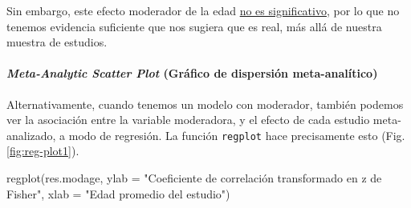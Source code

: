 \documentclass[
  bookmarksnumbered]{article}
\newenvironment{Shaded}{\begin{snugshade}}{\end{snugshade}}
\newcommand{\AttributeTok}[1]{\textcolor[rgb]{0.00,0.34,0.68}{#1}}
\newcommand{\FunctionTok}[1]{\textcolor[rgb]{0.39,0.29,0.61}{#1}}
\newcommand{\NormalTok}[1]{\textcolor[rgb]{0.12,0.11,0.11}{#1}}
\newcommand{\StringTok}[1]{\textcolor[rgb]{0.75,0.01,0.01}{#1}}
\begin{document}
Sin embargo, este efecto moderador de la edad \underline{no es significativo}, por lo que no tenemos evidencia suficiente que nos sugiera que es real, más allá de nuestra muestra de estudios.

\hypertarget{meta-analytic-scatter-plot-gruxe1fico-de-dispersiuxf3n-meta-analuxedtico}{%
\paragraph{\texorpdfstring{\emph{Meta-Analytic Scatter Plot} (Gráfico de dispersión meta-analítico)}{Meta-Analytic Scatter Plot (Gráfico de dispersión meta-analítico)}}\label{meta-analytic-scatter-plot-gruxe1fico-de-dispersiuxf3n-meta-analuxedtico}}

Alternativamente, cuando tenemos un modelo con moderador, también podemos ver la asociación entre la variable moderadora, y el efecto de cada estudio meta-analizado, a modo de regresión. La función \texttt{regplot} hace precisamente esto (Fig. \ref{fig:reg-plot1}).

\begin{Shaded}
\begin{Highlighting}[]
\FunctionTok{regplot}\NormalTok{(res.modage,}
        \AttributeTok{ylab =} \StringTok{"Coeficiente de correlación transformado en z de Fisher"}\NormalTok{,}
        \AttributeTok{xlab =} \StringTok{"Edad promedio del estudio"}\NormalTok{)}
\end{Highlighting}
\end{Shaded}
\end{document}

